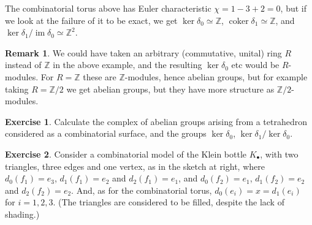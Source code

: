 \documentclass{tufte-handout}
\def\ZZ{\mathbb{Z}}
\DeclareMathOperator{\coker}{coker}
\DeclareMathOperator{\im}{im}
\theoremstyle{definition}
\newtheorem{ex}{Exercise}
\newtheorem*{rem}{Remark}
\begin{document}
The combinatorial torus above has Euler characteristic $\chi=1 - 3 + 2 = 0$, but if we look
at the failure of it to be exact, we get $\ker\delta_0 \simeq \ZZ$, $\coker\delta_1 \simeq \ZZ$, and 
$\ker\delta_1/\im\delta_0 \simeq \ZZ^2$.

\begin{rem}
We could have taken an arbitrary (commutative, unital) ring $R$ instead of $\ZZ$ in the 
above example, and the resulting $\ker\delta_0$ etc would be $R$-modules. For $R=\ZZ$ these are
$\ZZ$-modules, hence abelian groups, but for example taking $R=\ZZ/2$ we get abelian groups, 
but they have more structure as $\ZZ/2$-modules.
\end{rem}


\begin{ex}
Calculate 
the complex of abelian groups arising from a tetrahedron considered as a combinatorial
surface, and the groups $\ker\delta_0$, $\ker\delta_1/\ker\delta_0$.
\end{ex}

\begin{ex}
Consider
a combinatorial model of the Klein bottle $K_\bullet$, with two triangles, 
three edges and one vertex, as in the sketch at right, where $d_0(f_1) = e_3$, 
$d_1(f_1) = e_2$ and $d_2(f_1) = e_1$, and $d_0(f_2) = e_1$, $d_1(f_2) = e_2$ and $d_2(f_2) = e_2$.
And, as for the combinatorial torus, $d_0(e_i) = x = d_1(e_i)$ for $i=1,2,3$.
(The triangles are considered to be filled, despite the lack of shading.)
\end{ex}
\end{document}
